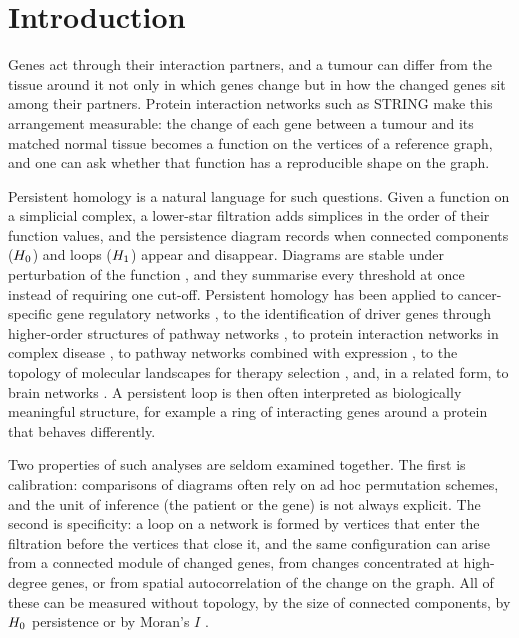\section{Introduction}\label{sec:intro}

Genes act through their interaction partners, and a tumour can differ from the tissue around it not only in which genes change but in how the changed genes sit among their partners. Protein interaction networks such as STRING \citep{szklarczyk2023} make this arrangement measurable: the change of each gene between a tumour and its matched normal tissue becomes a function on the vertices of a reference graph, and one can ask whether that function has a reproducible shape on the graph.

Persistent homology \citep{edelsbrunner2002} is a natural language for such questions. Given a function on a simplicial complex, a lower-star filtration adds simplices in the order of their function values, and the persistence diagram records when connected components ($H_{0}$) and loops ($H_{1}$) appear and disappear. Diagrams are stable under perturbation of the function \citep{cohensteiner2007}, and they summarise every threshold at once instead of requiring one cut-off. Persistent homology has been applied to cancer-specific gene regulatory networks \citep{masoomy2021}, to the identification of driver genes through higher-order structures of pathway networks \citep{ramos2025}, to protein interaction networks in complex disease \citep{song2023}, to pathway networks combined with expression \citep{abdullahi2025}, to the topology of molecular landscapes for therapy selection \citep{rietman2017,benzekry2015}, and, in a related form, to brain networks \citep{lee2012}. A persistent loop is then often interpreted as biologically meaningful structure, for example a ring of interacting genes around a protein that behaves differently.

Two properties of such analyses are seldom examined together. The first is calibration: comparisons of diagrams often rely on ad hoc permutation schemes, and the unit of inference (the patient or the gene) is not always explicit. The second is specificity: a loop on a network is formed by vertices that enter the filtration before the vertices that close it, and the same configuration can arise from a connected module of changed genes, from changes concentrated at high-degree genes, or from spatial autocorrelation of the change on the graph. All of these can be measured without topology, by the size of connected components, by $H_{0}$ persistence or by Moran's $I$ \citep{moran1950}.

